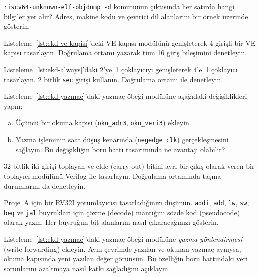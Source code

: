 \begin{alistirma}[\kolay]
\texttt{riscv64-unknown-elf-objdump -d} komutunun çıktısında her satırda hangi bilgiler yer alır? Adres, makine kodu ve çevirici dil alanlarını bir örnek üzerinde gösterin.
\end{alistirma}

\begin{alistirma}[\orta]
Listeleme~\ref{lst:ekd-ve-kapisi}'deki VE kapısı modülünü genişleterek 4 girişli bir VE kapısı tasarlayın. Doğrulama ortamı yazarak tüm 16 giriş bileşimini denetleyin.
\end{alistirma}

\begin{alistirma}[\orta]
Listeleme~\ref{lst:ekd-always}'daki 2'ye~1 çoklayıcıyı genişleterek 4'e~1 çoklayıcı tasarlayın. 2 bitlik \texttt{sec} girişi kullanın. Doğrulama ortamı ile denetleyin.
\end{alistirma}

\begin{alistirma}[\orta]
Listeleme~\ref{lst:ekd-yazmac}'daki yazmaç öbeği modülüne aşağıdaki değişiklikleri yapın:
\begin{enumerate}[(a)]
\item Üçüncü bir okuma kapısı (\texttt{oku\_adr3}, \texttt{oku\_veri3}) ekleyin.
\item Yazma işleminin saat düşüş kenarında (\texttt{negedge clk}) gerçekleşmesini sağlayın. Bu değişikliğin boru hattı tasarımında ne avantajı olabilir?
\end{enumerate}
\end{alistirma}

\begin{alistirma}[\orta]
32 bitlik iki girişi toplayan ve elde (carry-out) bitini ayrı bir çıkış olarak veren bir toplayıcı modülünü Verilog ile tasarlayın. Doğrulama ortamında taşma durumlarını da denetleyin.
\end{alistirma}

\begin{alistirma}[\orta]
Proje~A için bir RV32I yorumlayıcısı tasarladığınızı düşünün. \texttt{addi}, \texttt{add}, \texttt{lw}, \texttt{sw}, \texttt{beq} ve \texttt{jal} buyrukları için çözme (decode) mantığını sözde kod (pseudocode) olarak yazın. Her buyruğun bit alanlarını nasıl çıkaracağınızı gösterin.
\end{alistirma}

\begin{alistirma}[\zor]
Listeleme~\ref{lst:ekd-yazmac}'daki yazmaç öbeği modülüne \emph{yazma yönlendirmesi} (write forwarding) ekleyin. Aynı çevrimde yazılan ve okunan yazmaç aynıysa, okuma kapısında yeni yazılan değer görünsün. Bu özelliğin boru hattındaki veri sorunlarını azaltmaya nasıl katkı sağladığını açıklayın.
\end{alistirma}

